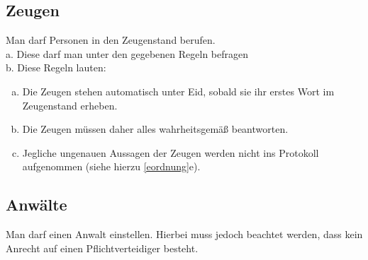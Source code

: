 \documentclass{article}
\begin{document}
\subsection{Zeugen}\label{zeugen}
Man darf Personen in den Zeugenstand berufen.\\
a. Diese darf man unter den gegebenen Regeln befragen  \\
b. Diese Regeln lauten:  \\
\begin{enumerate}[a)]
	\item Die Zeugen stehen automatisch unter Eid, sobald sie ihr erstes Wort im Zeugenstand erheben.
	\item Die Zeugen müssen daher alles wahrheitsgemäß beantworten.
	\item Jegliche ungenauen Aussagen der Zeugen werden nicht ins Protokoll aufgenommen (siehe hierzu \ref{eordnung}e).
\end{enumerate}

\subsection{Anwälte}
Man darf einen Anwalt einstellen. Hierbei muss jedoch beachtet werden, dass kein Anrecht auf einen Pflichtverteidiger besteht.
\end{document}

